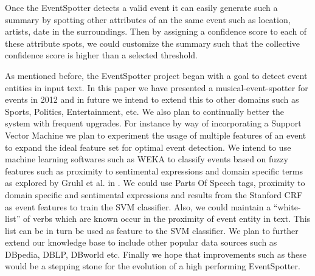 \documentclass[a4paper,11pt]{report}
\begin{document}
Once the EventSpotter detects a valid event it can easily generate such a summary by spotting other attributes of an the same event such as location, artists, date in the surroundings. Then by assigning a confidence score to each of these attribute spots, we could customize the summary such that the collective confidence score is higher than a selected threshold.

As mentioned before, the EventSpotter project began with a goal to detect event entities in input text. In this paper we have presented a musical-event-spotter for events in 2012 and in future we intend to extend this to other domains such as Sports, Politics, Entertainment, etc. We also plan to continually better the system with frequent upgrades. For instance by way of incorporating a Support Vector Machine we plan to experiment the usage of multiple features of an event to expand the ideal feature set for optimal event detection. We intend to use machine learning softwares such as WEKA to classify events based on fuzzy features such as proximity to sentimental expressions and domain specific terms as explored by Gruhl et al. in \cite{Gruhl_contextand}. We could use Parts Of Speech tags, proximity to domain specific and sentimental expressions and results from the Stanford CRF as event features to train the SVM classifier. Also, we could maintain a ``white-list'' of verbs which are known occur in the proximity of event entity in text. This list can be in turn be used as feature to the SVM classifier. We plan to further extend our knowledge base to include other popular data sources such as DBpedia, DBLP, DBworld etc. Finally we hope that improvements such as these would be a stepping stone for the evolution of a high performing EventSpotter.

{}
\end{document}
